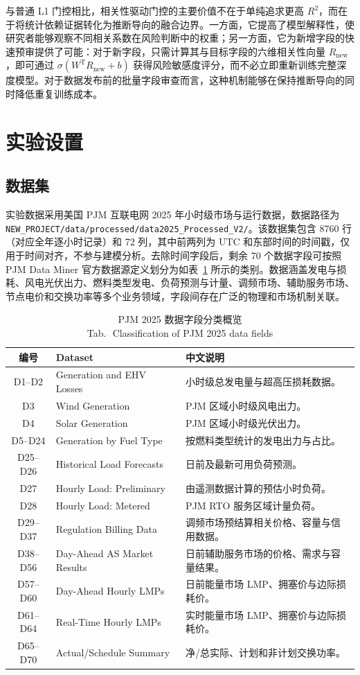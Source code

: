 \documentclass[UTF8,zihao=5,twoside]{ctexart}
\numberwithin{equation}{section}
\newcommand{\tabbicaption}[2]{%
  \caption{#1\\[-0.2em]\small Tab.\,\thetable\ #2}
}
\newcommand{\code}[1]{\texttt{#1}}
\begin{document}
与普通 L1 门控相比，相关性驱动门控的主要价值不在于单纯追求更高 $R^2$，而在于将统计依赖证据转化为推断导向的融合边界。一方面，它提高了模型解释性，使研究者能够观察不同相关系数在风险判断中的权重；另一方面，它为新增字段的快速预审提供了可能：对于新字段，只需计算其与目标字段的六维相关性向量 $R_{\mathrm{new}}$，即可通过 $\sigma(W^{\mathrm{T}}R_{\mathrm{new}}+b)$ 获得风险敏感度评分，而不必立即重新训练完整深度模型。对于数据发布前的批量字段审查而言，这种机制能够在保持推断导向的同时降低重复训练成本。

\section{实验设置}
\subsection{数据集}
实验数据采用美国 PJM 互联电网 2025 年小时级市场与运行数据，数据路径为 \code{NEW\_PROJECT/data/processed/data2025\_Processed\_V2/}。该数据集包含 8760 行（对应全年逐小时记录）和 72 列，其中前两列为 UTC 和东部时间的时间戳，仅用于时间对齐，不参与建模分析。去除时间字段后，剩余 70 个数据字段可按照 PJM Data Miner 官方数据源定义划分为如表~\ref{tab:data_overview} 所示的类别。数据涵盖发电与损耗、风电光伏出力、燃料类型发电、负荷预测与计量、调频市场、辅助服务市场、节点电价和交换功率等多个业务领域，字段间存在广泛的物理和市场机制关联。

\begin{table}[!tbp]
\centering
\scriptsize
\setlength{\tabcolsep}{2pt}
\tabbicaption{PJM 2025 数据字段分类概览}{Classification of PJM 2025 data fields}
\label{tab:data_overview}
\begin{tabularx}{\columnwidth}{c>{\raggedright\arraybackslash}p{}X}
\toprule
编号 & Dataset & 中文说明 \\
\midrule
D1--D2 & Generation and EHV Losses & 小时级总发电量与超高压损耗数据。 \\
D3 & Wind Generation & PJM 区域小时级风电出力。 \\
D4 & Solar Generation & PJM 区域小时级光伏出力。 \\
D5--D24 & Generation by Fuel Type & 按燃料类型统计的发电出力与占比。 \\
D25--D26 & Historical Load Forecasts & 日前及最新可用负荷预测。 \\
D27 & Hourly Load: Preliminary & 由遥测数据计算的预估小时负荷。 \\
D28 & Hourly Load: Metered & PJM RTO 服务区域计量负荷。 \\
D29--D37 & Regulation Billing Data & 调频市场预结算相关价格、容量与信用数据。 \\
D38--D56 & Day-Ahead AS Market Results & 日前辅助服务市场的价格、需求与容量结果。 \\
D57--D60 & Day-Ahead Hourly LMPs & 日前能量市场 LMP、拥塞价与边际损耗价。 \\
D61--D64 & Real-Time Hourly LMPs & 实时能量市场 LMP、拥塞价与边际损耗价。 \\
D65--D70 & Actual/Schedule Summary & 净/总实际、计划和非计划交换功率。 \\
\bottomrule
\end{tabularx}
\end{table}
\end{document}
